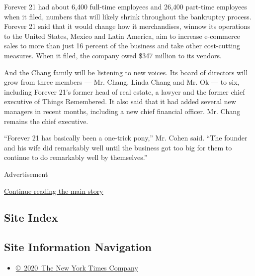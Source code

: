 Forever 21 had about 6,400 full-time employees and 26,400 part-time
employees when it filed, numbers that will likely shrink throughout the
bankruptcy process. Forever 21 said that it would change how it
merchandises, winnow its operations to the United States, Mexico and
Latin America, aim to increase e-commerce sales to more than just 16
percent of the business and take other cost-cutting measures. When it
filed, the company owed \$347 million to its vendors.

And the Chang family will be listening to new voices. Its board of
directors will grow from three members --- Mr. Chang, Linda Chang and
Mr. Ok --- to six, including Forever 21's former head of real estate, a
lawyer and the former chief executive of Things Remembered. It also said
that it had added several new managers in recent months, including a new
chief financial officer. Mr. Chang remains the chief executive.

``Forever 21 has basically been a one-trick pony,'' Mr. Cohen said.
``The founder and his wife did remarkably well until the business got
too big for them to continue to do remarkably well by themselves.''

Advertisement

\protect\hyperlink{after-bottom}{Continue reading the main story}

\hypertarget{site-index}{%
\subsection{Site Index}\label{site-index}}

\hypertarget{site-information-navigation}{%
\subsection{Site Information
Navigation}\label{site-information-navigation}}

\begin{itemize}
\tightlist
\item
  \href{https://help.nytimes3xbfgragh.onion/hc/en-us/articles/115014792127-Copyright-notice}{©~2020~The
  New York Times Company}
\end{itemize}

